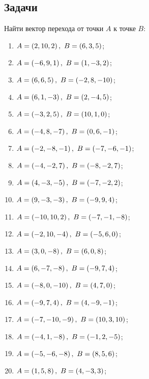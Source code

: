 \subsection{Задачи}

	Найти вектор перехода от точки $A$ к точке $B$:
	\begin{enumerate}
		\setcounter{enumi}{\value{tasks}}
			
			\item \( \displaystyle A = \left( 2, 10, 2 \right), ~ B = \left( 6, 3, 5 \right) \);
			\item \( \displaystyle A = \left( -6, 9, 1 \right), ~ B = \left( 1, -3, 2 \right) \);
			\item \( \displaystyle A = \left( 6, 6, 5 \right), ~ B = \left( -2, 8, -10 \right) \);
			\item \( \displaystyle A = \left( 6, 1, -3 \right), ~ B = \left( 2, -4, 5 \right) \);
			\item \( \displaystyle A = \left( -3, 2, 5 \right), ~ B = \left( 10, 1, 0 \right) \);
			\item \( \displaystyle A = \left( -4, 8, -7 \right), ~ B = \left( 0, 6, -1 \right) \);
			\item \( \displaystyle A = \left( -2, -8, -1 \right), ~ B = \left( -7, -6, -1 \right) \);
			\item \( \displaystyle A = \left( -4, -2, 7 \right), ~ B = \left( -8, -2, 7 \right) \);
			\item \( \displaystyle A = \left( 4, -3, -5 \right), ~ B = \left( -7, -2, 2 \right) \);
			\item \( \displaystyle A = \left( 9, -3, -3 \right), ~ B = \left( -9, 9, 4 \right) \);
			\item \( \displaystyle A = \left( -10, 10, 2 \right), ~ B = \left( -7, -1, -8 \right) \);
			\item \( \displaystyle A = \left( -2, 10, -4 \right), ~ B = \left( -5, 6, 0 \right) \);
			\item \( \displaystyle A = \left( 3, 0, -8 \right), ~ B = \left( 6, 0, 8 \right) \);
			\item \( \displaystyle A = \left( 6, -7, -8 \right), ~ B = \left( -9, 7, 4 \right) \);
			\item \( \displaystyle A = \left( -8, 0, -10 \right), ~ B = \left( 4, 7, 0 \right) \);
			\item \( \displaystyle A = \left( -9, 7, 4 \right), ~ B = \left( 4, -9, -1 \right) \);
			\item \( \displaystyle A = \left( -7, -10, -9 \right), ~ B = \left( 10, 3, 10 \right) \);
			\item \( \displaystyle A = \left( -4, 1, -8 \right), ~ B = \left( -1, 2, -5 \right) \);
			\item \( \displaystyle A = \left( -5, -6, -8 \right), ~ B = \left( 8, 5, 6 \right) \);
			\item \( \displaystyle A = \left( 1, 5, 8 \right), ~ B = \left( 4, -3, 3 \right) \);

		\setcounter{tasks}{\value{enumi}}
	\end{enumerate}

